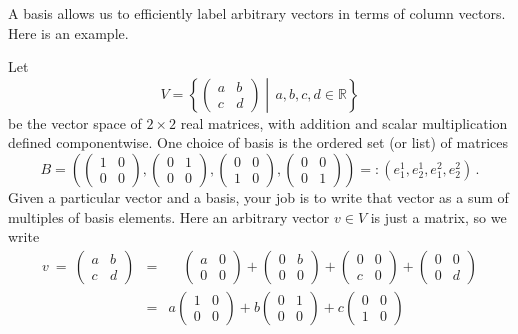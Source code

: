 \noindent
A basis allows us to efficiently label arbitrary vectors in terms of column vectors. Here is an  example.
\begin{example}
Let \[V=\left\{\begin{pmatrix}a&b\\c&d\end{pmatrix}\middle| \,a,b,c,d\in {\mathbb R}\right\}\] be the vector space of $2\times 2$ real matrices,
with addition and scalar multiplication defined componentwise. 
One choice of basis is the ordered set (or list) of matrices
\[B=\left(\begin{pmatrix}1&0\\0&0\end{pmatrix},\begin{pmatrix}0&1\\0&0\end{pmatrix},\begin{pmatrix}0&0\\ 1&0\end{pmatrix},\begin{pmatrix}0&0\\ 0&1\end{pmatrix}\right)=:(e_1^1,e_2^1,e^2_1,e^2_2)\, .\] 
Given a particular vector and a basis, your job is to write that vector as a sum of multiples of basis elements. Here
an arbitrary vector $v\in V$ is just a matrix, so we write
\begin{eqnarray*}
v\ =\ \begin{pmatrix}a&b\\c&d\end{pmatrix}&=&\quad\!\! \begin{pmatrix}a&0\\0&0\end{pmatrix}+\begin{pmatrix}0&b\\0&0\end{pmatrix}+\begin{pmatrix}0&0\\ c&0\end{pmatrix}+\begin{pmatrix}0&0\\0&d\end{pmatrix}\\[1mm]
&=&a\begin{pmatrix}1&0\\0&0\end{pmatrix}+b\begin{pmatrix}0&1\\0&0\end{pmatrix}+c\begin{pmatrix}0&0\\ 1&0\end{pmatrix}

\end{eqnarray*}
\end{example}
